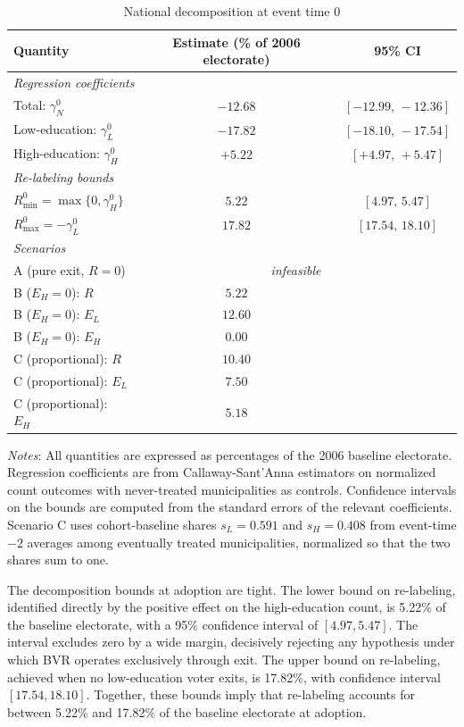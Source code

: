 \begin{table}[!ht]
\centering
\caption{National decomposition at event time 0}
\label{tab:decomposition_results}
\begin{tabular}{lcc}
\toprule
Quantity & Estimate (\% of 2006 electorate) & 95\% CI \\
\midrule
\multicolumn{3}{l}{\textit{Regression coefficients}} \\
Total: $\gamma_N^0$ & $-12.68$ & $[-12.99,\, -12.36]$ \\
Low-education: $\gamma_L^0$ & $-17.82$ & $[-18.10,\, -17.54]$ \\
High-education: $\gamma_H^0$ & $+5.22$ & $[+4.97,\, +5.47]$ \\
\midrule
\multicolumn{3}{l}{\textit{Re-labeling bounds}} \\
$R_{\min}^0 = \max\{0, \gamma_H^0\}$ & $5.22$ & $[4.97,\, 5.47]$ \\
$R_{\max}^0 = -\gamma_L^0$ & $17.82$ & $[17.54,\, 18.10]$ \\
\midrule
\multicolumn{3}{l}{\textit{Scenarios}} \\
A (pure exit, $R = 0$) & \multicolumn{2}{c}{\textit{infeasible}} \\
B ($E_H = 0$): $R$ & $5.22$ & \\
B ($E_H = 0$): $E_L$ & $12.60$ & \\
B ($E_H = 0$): $E_H$ & $0.00$ & \\
C (proportional): $R$ & $10.40$ & \\
C (proportional): $E_L$ & $7.50$ & \\
C (proportional): $E_H$ & $5.18$ & \\
\bottomrule
\end{tabular}

\medskip
\footnotesize
\textit{Notes}: All quantities are expressed as percentages of the 2006 baseline electorate. Regression coefficients are from Callaway-Sant'Anna estimators on normalized count outcomes with never-treated municipalities as controls. Confidence intervals on the bounds are computed from the standard errors of the relevant coefficients. Scenario C uses cohort-baseline shares $s_L = 0.591$ and $s_H = 0.408$ from event-time $-2$ averages among eventually treated municipalities, normalized so that the two shares sum to one.
\end{table}

The decomposition bounds at adoption are tight. The lower bound on re-labeling, identified directly by the positive effect on the high-education count, is 5.22\% of the baseline electorate, with a 95\% confidence interval of $[4.97, 5.47]$. The interval excludes zero by a wide margin, decisively rejecting any hypothesis under which BVR operates exclusively through exit. The upper bound on re-labeling, achieved when no low-education voter exits, is 17.82\%, with confidence interval $[17.54, 18.10]$. Together, these bounds imply that re-labeling accounts for between 5.22\% and 17.82\% of the baseline electorate at adoption.

